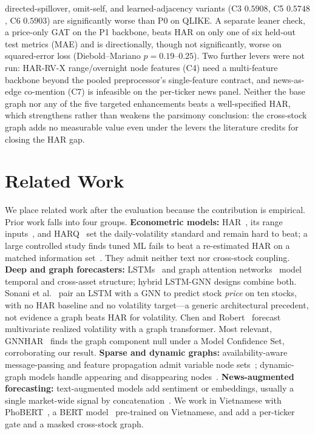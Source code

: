 \documentclass[runningheads]{llncs}
\begin{document}
directed-spillover, omit-self, and learned-adjacency variants (C3 $0.5908$, C5 $0.5748$, C6 $0.5903$) are
significantly worse than P0 on QLIKE. A separate leaner check, a price-only GAT on the P1 backbone, beats
HAR on only one of six held-out test metrics (MAE) and is directionally, though not significantly, worse
on squared-error loss (Diebold--Mariano $p=0.19$--$0.25$). Two further levers were not run: HAR-RV-X
range/overnight node features (C4) need a multi-feature backbone beyond the pooled preprocessor's
single-feature contract, and news-as-edge co-mention (C7) is infeasible on the per-ticker news panel.
Neither the base graph nor any of the five targeted enhancements beats a well-specified HAR, which
strengthens rather than weakens the parsimony conclusion: the cross-stock graph adds no measurable value
even under the levers the literature credits for closing the HAR gap.

\section{Related Work}
\label{sec:related}
We place related work after the evaluation because the contribution is empirical. Prior work falls into
four groups. \textbf{Econometric models:} HAR~\cite{corsi2009}, its range inputs~\cite{parkinson1980}, and
HARQ~\cite{bpq2016} set the daily-volatility standard and remain hard to beat; a large controlled study
finds tuned ML fails to beat a re-estimated HAR on a matched information set~\cite{audrino2025}. They admit
neither text nor cross-stock coupling. \textbf{Deep and graph forecasters:} LSTMs~\cite{hochreiter1997} and
graph attention networks~\cite{velickovic2018} model temporal and cross-asset structure; hybrid LSTM-GNN
designs combine both. Sonani et al.~\cite{sonani2025} pair an LSTM with a GNN to predict stock \emph{price}
on ten stocks, with no HAR baseline and no volatility target---a generic architectural precedent, not
evidence a graph beats HAR for volatility. Chen and Robert~\cite{chen2022} forecast multivariate realized
volatility with a graph transformer. Most relevant, GNNHAR~\cite{zhang2025gnnhar} finds the graph component
null under a Model Confidence Set, corroborating our result. \textbf{Sparse and dynamic graphs:}
availability-aware message-passing and feature propagation admit variable node sets~\cite{rossi2022};
dynamic-graph models handle appearing and disappearing nodes~\cite{evolvegcn}. \textbf{News-augmented
forecasting:} text-augmented models add sentiment or embeddings, usually a single market-wide signal by
concatenation~\cite{ouyang2021,das2024}. We work in Vietnamese with PhoBERT~\cite{phobert2020}, a BERT
model~\cite{devlin2019} pre-trained on Vietnamese, and add a per-ticker gate and a masked cross-stock
graph.
\end{document}
